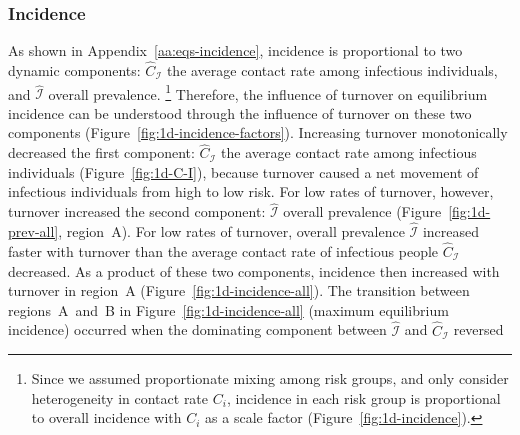 \subsubsection{Incidence}
As shown in Appendix~\ref{aa:eqs-incidence}, incidence
is proportional to two dynamic components:
$\hat{C}_{\mathcal{I}}$ the average contact rate among infectious individuals, and
$\hat{\mathcal{I}}$ overall prevalence.%
\footnote{Since we assumed proportionate mixing among risk groups,
  and only consider heterogeneity in contact rate $C_i$,
  incidence in each risk group is proportional to overall incidence
  with $C_i$ as a scale factor (Figure~\ref{fig:1d-incidence}).}
Therefore, the influence of turnover on equilibrium incidence
can be understood through the influence of turnover on these two components
(Figure~\ref{fig:1d-incidence-factors}).
Increasing turnover monotonically decreased the first component:
$\hat{C}_{\mathcal{I}}$ the average contact rate among infectious individuals
(Figure~\ref{fig:1d-C-I}), because
turnover caused a net movement of infectious individuals from high to low risk.
For low rates of turnover, however,
turnover increased the second component:
$\hat{\mathcal{I}}$ overall prevalence
(Figure~\ref{fig:1d-prev-all}, region~A).
For low rates of turnover,
overall prevalence $\hat{\mathcal{I}}$
increased faster with turnover than
the average contact rate of infectious people $\hat{C}_{\mathcal{I}}$ decreased.
As a product of these two components,
incidence then increased with turnover in region~A
(Figure~\ref{fig:1d-incidence-all}).
The transition between regions~A~and~B in Figure~\ref{fig:1d-incidence-all}
(maximum equilibrium incidence) occurred when the dominating component
between $\hat{\mathcal{I}}$ and $\hat{C}_{\mathcal{I}}$ reversed
